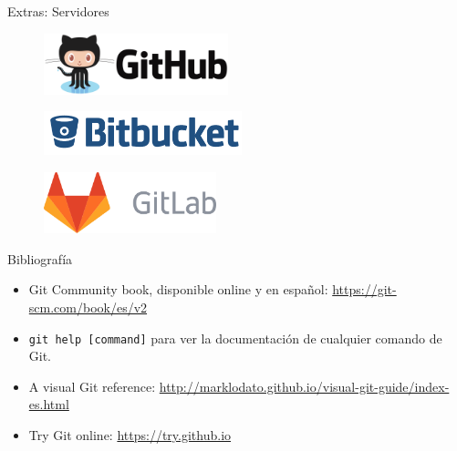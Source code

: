 \begin{frame}[t]{Extras: Servidores}

    \begin{figure}[ht]
        \begin{center}
            \includegraphics[height=0.7in]{images/github.png}
        \end{center}
    \end{figure}

    \begin{figure}[ht]
        \begin{center}
            \includegraphics[height=0.5in]{images/bitbucket.png}
        \end{center}
    \end{figure}

    \begin{figure}[ht]
        \begin{center}
            \includegraphics[height=0.7in]{images/gitlab.png}
        \end{center}
    \end{figure}

\end{frame}

\begin{frame}[t]{Bibliografía}

    \begin{itemize}
        \item Git Community book, disponible online y en español: \url{https://git-scm.com/book/es/v2}
        \item \texttt{git help [command]} para ver la documentación de cualquier comando de Git.
        \item A visual Git reference: \url{http://marklodato.github.io/visual-git-guide/index-es.html}
        \item Try Git online: \url{https://try.github.io}
    \end{itemize}

\end{frame}
